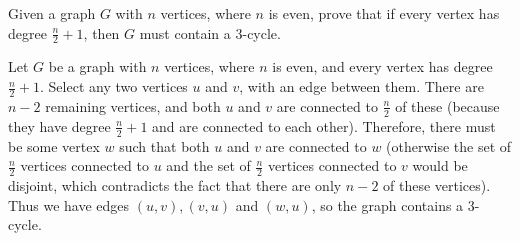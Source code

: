 \question Given a graph $G$ with $n$ vertices, where $n$ is even, 
prove that if every vertex has degree $\frac{n}{2}+1$, then $G$ 
must contain a 3-cycle. 

\begin{solution}[1 in]
Let $G$ be a graph with $n$ vertices, where $n$ is even, and every 
vertex has degree $\frac{n}{2} + 1$. Select any two vertices $u$ and 
$v$, with an edge between them. There are $n - 2$ remaining vertices, 
and both $u$ and $v$ are connected to $\frac{n}{2}$ of these (because 
they have degree $\frac{n}{2} + 1$ and are connected to each other). 
Therefore, there must be some vertex $w$ such that both $u$ and $v$ 
are connected to $w$ (otherwise the set of $\frac{n}{2}$ vertices 
connected to $u$ and the set of $\frac{n}{2}$ vertices connected to 
$v$ would be disjoint, which contradicts the fact that there are only 
$n - 2$ of these vertices). Thus we have edges $(u, v), (v, u)$ and 
$(w, u)$, so the graph contains a 3-cycle.
\end{solution}